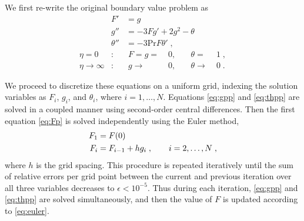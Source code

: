 \documentclass[11pt]{article}
\begin{document}
We first re-write the original boundary value problem as
\begin{align}
F' &= g
\label{eq:Fp}
\\
g'' &= - 3 F g' + 2g^2 - \theta
\label{eq:gpp}
\\
\theta'' &= -3 \text{Pr} F \theta' \;,
\label{eq:thpp}
\end{align}
\begin{equation}
\begin{aligned}
\eta = 0 &: &\quad F = g =\; &0, &\quad \theta =\; &1 \;, \\
\eta \rightarrow \infty &: &\quad g \rightarrow\; &0, &\quad \theta \rightarrow\; &0
\;.
\end{aligned}
\end{equation}

We proceed to discretize these equations on a uniform grid, indexing the solution variables as $F_i$, $g_i$, and $\theta_i$, where $i = 1, \dots, N$. Equations \eqref{eq:gpp} and \eqref{eq:thpp} are solved in a coupled manner using second-order central differences. Then the first equation \eqref{eq:Fp} is solved independently using the Euler method,
\begin{align}
F_1 &= F(0) \notag \\
F_i &= F_{i-1} + h g_i \;, \qquad i = 2,\dots,N \;,
\label{eq:euler}
\end{align}
where $h$ is the grid spacing. This procedure is repeated iteratively until the sum of relative errors per grid point between the current and previous iteration over all three variables decreases to $\epsilon < 10^{-5}$. Thus during each iteration, \eqref{eq:gpp} and \eqref{eq:thpp} are solved simultaneously, and then the value of $F$ is updated according to \eqref{eq:euler}.
\end{document}
